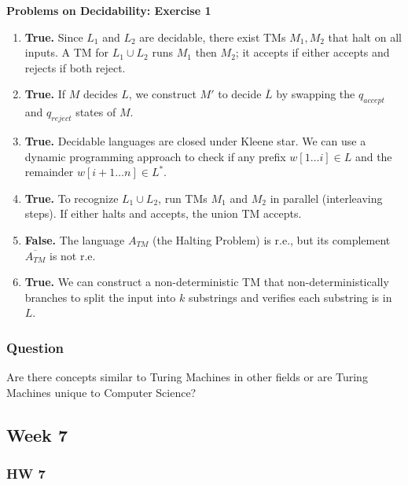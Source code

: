 \documentclass{article}
\theoremstyle{theorem}
\theoremstyle{definition}
\theoremstyle{remark}
\begin{document}
\textbf{Problems on Decidability: Exercise 1}
\begin{enumerate}
    \item \textbf{True.} Since $L_1$ and $L_2$ are decidable, there exist TMs $M_1, M_2$ that halt on all inputs. A TM for $L_1 \cup L_2$ runs $M_1$ then $M_2$; it accepts if either accepts and rejects if both reject.
    
    \item \textbf{True.} If $M$ decides $L$, we construct $M'$ to decide $\overline{L}$ by swapping the $q_{accept}$ and $q_{reject}$ states of $M$.
    
    \item \textbf{True.} Decidable languages are closed under Kleene star. We can use a dynamic programming approach to check if any prefix $w[1 \dots i] \in L$ and the remainder $w[i+1 \dots n] \in L^*$.
    
    \item \textbf{True.} To recognize $L_1 \cup L_2$, run TMs $M_1$ and $M_2$ in parallel (interleaving steps). If either halts and accepts, the union TM accepts.
    
    \item \textbf{False.} The language $A_{TM}$ (the Halting Problem) is r.e., but its complement $\overline{A_{TM}}$ is not r.e.
    
    \item \textbf{True.} We can construct a non-deterministic TM that non-deterministically branches to split the input into $k$ substrings and verifies each substring is in $L$.
\end{enumerate}

\subsubsection{Question}
Are there concepts similar to Turing Machines in other fields or are Turing Machines unique to Computer Science?

\subsection{Week 7}

\subsubsection{HW 7}
\end{document}
